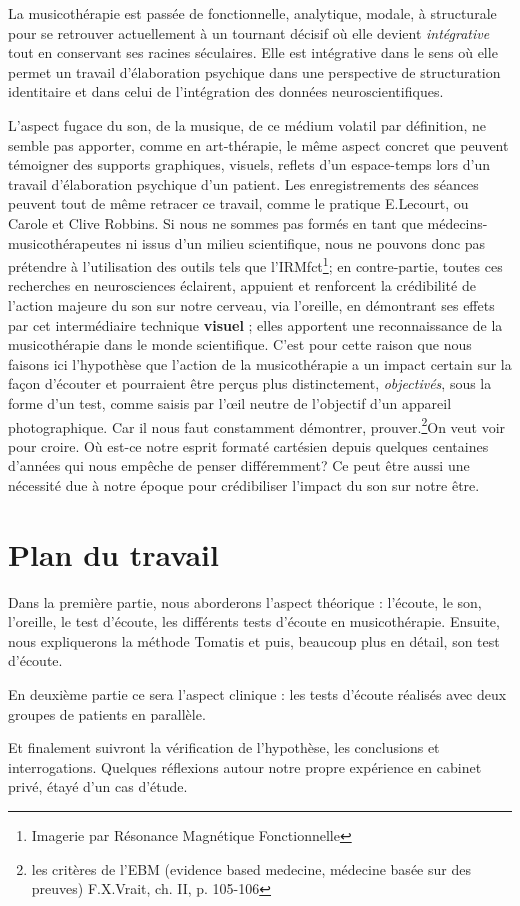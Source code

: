  La musicothérapie est passée de fonctionnelle, analytique, mo\-da\-le,  à struc\-tu\-rale pour se retrouver actuellement 
 à un tournant décisif où elle devient 
 \emph{intégrative} tout en conservant ses racines séculaires. Elle est intégrative dans le sens où elle permet un travail d'élaboration psychique dans une perspective de structuration identitaire \autocite[ch. III, p. 53, 105]{vrait_musicotherapie_2018} et dans celui de l'intégration des données neuroscientifiques.
 
  
L'aspect fugace du son, de la musique, de ce médium volatil par
définition, ne semble pas apporter, comme en art-thérapie, le
même aspect concret que peuvent témoigner des supports graphiques,
visuels, reflets d'un espace-temps lors d'un travail d'élaboration
psychique d'un patient. Les enregistrements des séances peuvent tout de même retracer ce travail, comme le pratique E.Lecourt, ou Carole et Clive Robbins.
Si nous ne sommes pas formés en tant que médecins- musicothérapeutes ni issus d'un milieu scientifique, nous ne pouvons donc  pas prétendre à l'utilisation des outils
 tels que l'IRMfct\footnote{Imagerie par Résonance Magnétique Fonctionnelle}; en contre-partie, toutes ces recherches en
neurosciences éclairent, appuient et renforcent la crédibilité de l'action
majeure du son sur notre cerveau, via l'oreille, en démontrant ses effets par cet intermédiaire technique \textbf{visuel} ; elles apportent une reconnaissance de la musicothérapie dans le monde scientifique. C'est pour cette raison que nous  faisons ici l'hypothèse que l'action de la musicothérapie a un impact certain sur la façon d'écouter et pourraient être perçus plus
distinctement, \textsl{objectivés}, sous la forme d'un test, comme saisis par l'\oe il neutre de l'objectif d'un appareil
photographique.
Car il nous faut constamment démontrer, prouver.\footnote{
	les critères de l'EBM (evidence based medecine, médecine basée sur des preuves) F.X.Vrait, ch. II, p. 105-106 }On veut voir pour croire. Où est-ce notre esprit formaté cartésien depuis quelques centaines d'années qui nous empêche de penser différemment? 
Ce peut être aussi une nécessité due à notre époque pour crédibiliser l'impact du son sur notre être. 


\section{Plan du travail}

Dans la première partie, nous aborderons l'aspect théorique : l'écoute, le son, l'oreille, le test d'écoute, les différents tests d'écoute en musicothérapie.  Ensuite, nous expliquerons  la méthode Tomatis
et puis, beaucoup plus en détail, son test d'écoute.

En deuxième partie ce sera l'aspect clinique : les tests d'écoute réalisés  avec deux groupes de patients en parallèle.

Et finalement suivront la vérification de l'hypothèse, les conclusions et interrogations. 
Quelques réflexions autour notre propre expérience en cabinet privé, étayé d'un cas d'étude.
